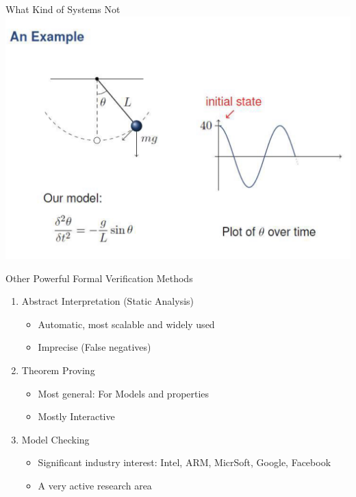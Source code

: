 \documentclass{beamer}
\begin{document}
\begin{frame}{What Kind of Systems Not}
\includegraphics[scale=0.3]{pics/contdynamics.png}
\end{frame}

\begin{frame}{Other Powerful Formal Verification Methods}
\begin{enumerate}
\item<1-> Abstract Interpretation (Static Analysis)
\begin{itemize}
\item Automatic, most scalable and widely used

\item Imprecise (False negatives)
\end{itemize}
\item<2-> Theorem Proving
\begin{itemize}
\item Most general: For Models and properties

\item Mostly Interactive
\end{itemize}

\item<3-> Model Checking
\begin{itemize}
\item Significant industry interest: Intel, ARM, MicrSoft, Google, Facebook
\item A very active research area
\end{itemize}
\end{enumerate}
\end{frame}
\end{document}
